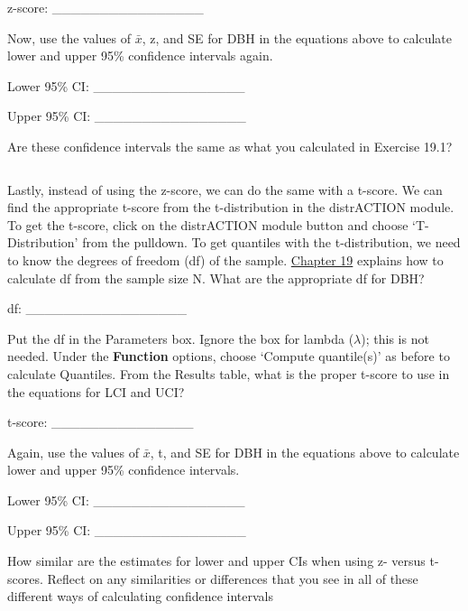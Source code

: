\documentclass[
]{scrbook}
\begin{document}
z-score: \_\_\_\_\_\_\_\_\_\_\_\_\_\_\_\_

Now, use the values of \(\bar{x}\), z, and SE for DBH in the equations above to calculate lower and upper 95\% confidence intervals again.

Lower 95\% CI: \_\_\_\_\_\_\_\_\_\_\_\_\_\_\_\_

Upper 95\% CI: \_\_\_\_\_\_\_\_\_\_\_\_\_\_\_\_

Are these confidence intervals the same as what you calculated in Exercise 19.1?

\begin{verbatim}

\end{verbatim}

Lastly, instead of using the z-score, we can do the same with a t-score.
We can find the appropriate t-score from the t-distribution in the distrACTION module.
To get the t-score, click on the distrACTION module button and choose `T-Distribution' from the pulldown.
To get quantiles with the t-distribution, we need to know the degrees of freedom (df) of the sample.
\protect\hyperlink{Chapter_19}{Chapter 19} explains how to calculate df from the sample size N.
What are the appropriate df for DBH?

df: \_\_\_\_\_\_\_\_\_\_\_\_\_\_\_\_\_

Put the df in the Parameters box.
Ignore the box for lambda (\(\lambda\)); this is not needed.
Under the \textbf{Function} options, choose `Compute quantile(s)' as before to calculate Quantiles.
From the Results table, what is the proper t-score to use in the equations for LCI and UCI?

t-score: \_\_\_\_\_\_\_\_\_\_\_\_\_\_\_

Again, use the values of \(\bar{x}\), t, and SE for DBH in the equations above to calculate lower and upper 95\% confidence intervals.

Lower 95\% CI: \_\_\_\_\_\_\_\_\_\_\_\_\_\_\_\_

Upper 95\% CI: \_\_\_\_\_\_\_\_\_\_\_\_\_\_\_\_

How similar are the estimates for lower and upper CIs when using z- versus t-scores.
Reflect on any similarities or differences that you see in all of these different ways of calculating confidence intervals

\begin{verbatim}




\end{verbatim}
\end{document}
